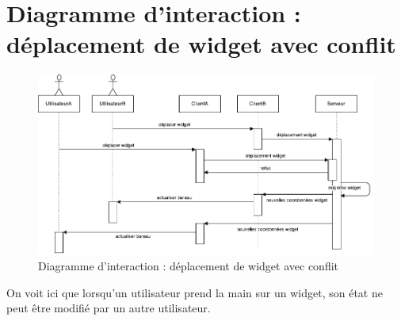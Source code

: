 \section{Diagramme d'interaction : déplacement de widget avec conflit}
\begin{figure}[H]
	\centering
	\includegraphics[angle=90]{diagrammes/DI3.pdf}
	\caption{Diagramme d'interaction : déplacement de widget avec conflit}
\end{figure}

On voit ici que lorsqu'un utilisateur prend la main sur un widget, son état ne peut être modifié par un autre utilisateur.